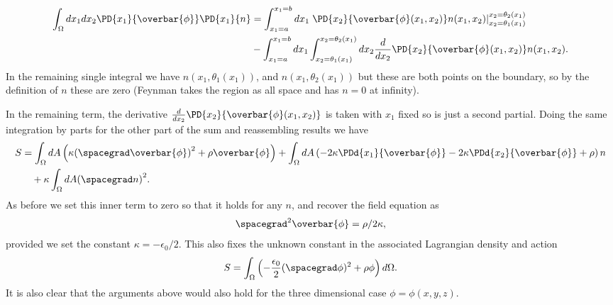 \begin{equation}\label{eqn:lagrangianFieldDensity:200}
\begin{aligned}
\int_{\Omega} dx_1 dx_2 \PD{x_1}{\overbar{\phi}} \PD{x_1}{n}
&= \int_{x_1=a}^{x_1=b} dx_1
\left. \PD{x_2}{\overbar{\phi}(x_1, x_2)} n(x_1, x_2) \right\vert_{x_2 = \theta_1(x_1)}^{x_2 = \theta_2(x_1)} \\
&- \int_{x_1=a}^{x_1=b} dx_1 \int_{x_2 = \theta_1(x_1)}^{x_2 = \theta_2(x_1)} dx_2 \frac{d}{dx_2} \PD{x_2}{\overbar{\phi}(x_1, x_2)} n(x_1, x_2) .
\end{aligned}
\end{equation}
%
In the remaining single integral we have
\(n(x_1, \theta_1(x_1))\), and \(n(x_1, \theta_2(x_1))\) but these are both points on the boundary, so by the definition of \(n\) these are zero (Feynman takes the
region as all space and has \(n=0\) at infinity).

In the remaining term, the derivative \(\frac{d}{d x_2} \PD{x_2}{\overbar{\phi}(x_1, x_2)}\) is taken with \(x_1\) fixed so is just a second partial.
Doing the same integration by parts for the other part of the sum and reassembling results we have
%
\begin{equation}\label{eqn:lagrangianFieldDensity:220}
\begin{aligned}
S &= \int_{\Omega} dA \left( \kappa {(\spacegrad \overbar{\phi})}^2 + \rho \overbar{\phi} \right)
  + \int_{\Omega} dA \left( -2 \kappa \PDd{x_1}{\overbar{\phi}} -2 \kappa \PDd{x_2}{\overbar{\phi}} + \rho \right) n \\
  &\quad + \kappa \int_{\Omega} dA {(\spacegrad n)}^2.
\end{aligned}
\end{equation}
%
As before we set this inner term to zero so that it holds for any \(n\), and recover the field equation as
%
\begin{equation}\label{eqn:lagrangianFieldDensity:1474}
\spacegrad^2 \overbar{\phi} = \rho/2 \kappa,
\end{equation}
%
provided we set the constant \(\kappa = -\epsilon_0/2\).  This also fixes the unknown constant in the associated Lagrangian density and action
%
\begin{equation}
S = \int_{\Omega} \left(- \frac{\epsilon_0}{2} (\spacegrad \phi)^2 + \rho \phi \right) d\Omega.
\end{equation}
%
It is also clear that the arguments above would also hold for the three dimensional case \(\phi = \phi(x, y, z)\).
%
